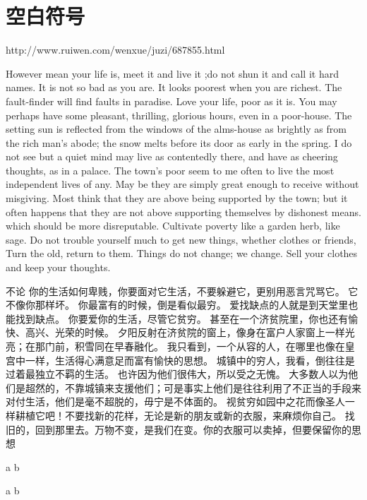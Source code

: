 \documentclass{article}
\begin{document}
    \section{空白符号}
http://www.ruiwen.com/wenxue/juzi/687855.html

However                mean your life is, meet it and live it ;do not shun it and call it hard names.
It is not so bad as you are.
It looks poorest when you are richest.
The fault-finder will find faults in paradise.
Love your life, poor as it is.
You may perhaps have some pleasant, thrilling, glorious hours, even in a poor-house.
The setting sun is reflected from the windows of the alms-house as brightly as from the rich man's abode; the snow melts before its door as early in the spring.
I do not see but a quiet mind may live as contentedly there, and have as cheering thoughts, as in a palace.
The town's poor seem to me often to live the most independent lives of any.
May be they are simply great enough to receive without misgiving.
Most think that they are above being supported by the town; but it often happens that they are not above supporting themselves by dishonest means.
which should be more disreputable.
Cultivate poverty like a garden herb, like sage.
Do not trouble yourself much to get new things, whether clothes or friends, Turn the old, return to them.
Things do not change; we change.
Sell your clothes and keep your thoughts.

不论                        你的生活如何卑贱，你要面对它生活，不要躲避它，更别用恶言咒骂它。
它不像你那样坏。
你最富有的时候，倒是看似最穷。
爱找缺点的人就是到天堂里也能找到缺点。
你要爱你的生活，尽管它贫穷。
甚至在一个济贫院里，你也还有愉快、高兴、光荣的时候。
夕阳反射在济贫院的窗上，像身在富户人家窗上一样光亮；在那门前，积雪同在早春融化。
我只看到，一个从容的人，在哪里也像在皇宫中一样，生活得心满意足而富有愉快的思想。
城镇中的穷人，我看，倒往往是过着最独立不羁的生活。
也许因为他们很伟大，所以受之无愧。
大多数人以为他们是超然的，不靠城镇来支援他们；可是事实上他们是往往利用了不正当的手段来对付生活，他们是毫不超脱的，毋宁是不体面的。
视贫穷如园中之花而像圣人一样耕植它吧！不要找新的花样，无论是新的朋友或新的衣服，来麻烦你自己。
找旧的，回到那里去。万物不变，是我们在变。你的衣服可以卖掉，但要保留你的思想


    a \quad b

    a \qquad b
\end{document}
